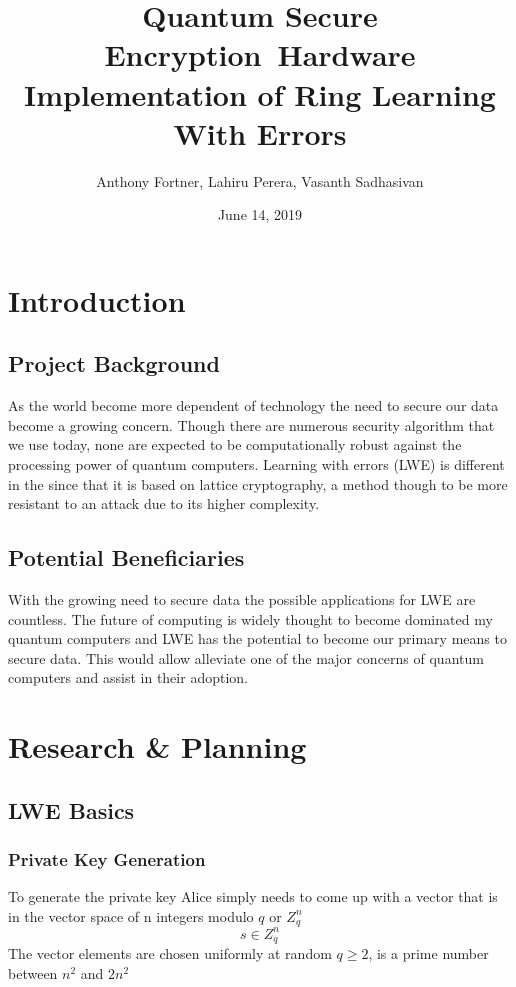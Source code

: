 \documentclass{article}
\title{Quantum Secure Encryption\ Hardware Implementation of Ring Learning With Errors}
\date{June 14, 2019}
\author{Anthony Fortner, Lahiru Perera, Vasanth Sadhasivan}
\begin{document}
\maketitle
\newpage
{}
  
\tableofcontents
\newpage

\section{Introduction}
\subsection{Project Background}
As the world become more dependent of technology the need to secure our data become a growing concern. Though there are numerous security algorithm that we use today, none are expected to be computationally robust against the processing power of quantum computers. Learning with errors (LWE) is different in the since that it is based on lattice cryptography, a method though to be more resistant to an attack due to its higher complexity. 
\subsection{Potential Beneficiaries}
With the growing need to secure data the possible applications for LWE are countless. The future of computing is widely thought to become dominated my quantum computers and LWE has the potential to become our primary means to secure data. This would allow alleviate one of the major concerns of quantum computers and assist in their adoption. 

\section{Research \& Planning}
\subsection{LWE Basics}
\subsubsection{Private Key Generation}
To generate the private key Alice simply needs to come up with a vector that is in the vector space of n integers modulo $q$ or $Z_q^n$
\begin{equation*}
	s \in Z_q^n
\end{equation*}
The vector elements are chosen uniformly at random
$q \geq 2$, is a prime number between $n^2$ and $2n^2$
\end{document}
